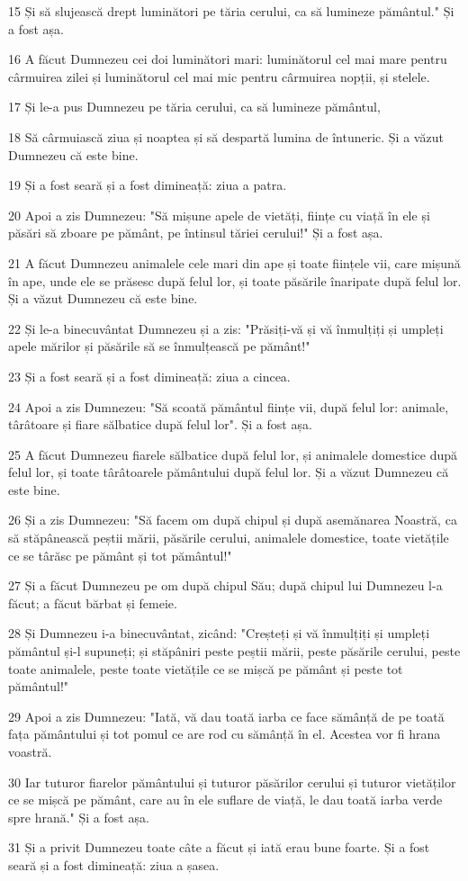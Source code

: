 \par 15 Și să slujească drept luminători pe tăria cerului, ca să lumineze pământul." Și a fost așa.
\par 16 A făcut Dumnezeu cei doi luminători mari: luminătorul cel mai mare pentru cârmuirea zilei și luminătorul cel mai mic pentru cârmuirea nopții, și stelele.
\par 17 Și le-a pus Dumnezeu pe tăria cerului, ca să lumineze pământul,
\par 18 Să cârmuiască ziua și noaptea și să despartă lumina de întuneric. Și a văzut Dumnezeu că este bine.
\par 19 Și a fost seară și a fost dimineață: ziua a patra.
\par 20 Apoi a zis Dumnezeu: "Să mișune apele de vietăți, ființe cu viață în ele și păsări să zboare pe pământ, pe întinsul tăriei cerului!" Și a fost așa.
\par 21 A făcut Dumnezeu animalele cele mari din ape și toate ființele vii, care mișună în ape, unde ele se prăsesc după felul lor, și toate păsările înaripate după felul lor. Și a văzut Dumnezeu că este bine.
\par 22 Și le-a binecuvântat Dumnezeu și a zis: "Prăsiți-vă și vă înmulțiți și umpleți apele mărilor și păsările să se înmulțească pe pământ!"
\par 23 Și a fost seară și a fost dimineață: ziua a cincea.
\par 24 Apoi a zis Dumnezeu: "Să scoată pământul ființe vii, după felul lor: animale, târâtoare și fiare sălbatice după felul lor". Și a fost așa.
\par 25 A făcut Dumnezeu fiarele sălbatice după felul lor, și animalele domestice după felul lor, și toate târâtoarele pământului după felul lor. Și a văzut Dumnezeu că este bine.
\par 26 Și a zis Dumnezeu: "Să facem om după chipul și după asemănarea Noastră, ca să stăpânească peștii mării, păsările cerului, animalele domestice, toate vietățile ce se târăsc pe pământ și tot pământul!"
\par 27 Și a făcut Dumnezeu pe om după chipul Său; după chipul lui Dumnezeu l-a făcut; a făcut bărbat și femeie.
\par 28 Și Dumnezeu i-a binecuvântat, zicând: "Creșteți și vă înmulțiți și umpleți pământul și-l supuneți; și stăpâniri peste peștii mării, peste păsările cerului, peste toate animalele, peste toate vietățile ce se mișcă pe pământ și peste tot pământul!"
\par 29 Apoi a zis Dumnezeu: "Iată, vă dau toată iarba ce face sămânță de pe toată fața pământului și tot pomul ce are rod cu sămânță în el. Acestea vor fi hrana voastră.
\par 30 Iar tuturor fiarelor pământului și tuturor păsărilor cerului și tuturor vietăților ce se mișcă pe pământ, care au în ele suflare de viață, le dau toată iarba verde spre hrană." Și a fost așa.
\par 31 Și a privit Dumnezeu toate câte a făcut și iată erau bune foarte. Și a fost seară și a fost dimineață: ziua a șasea.

